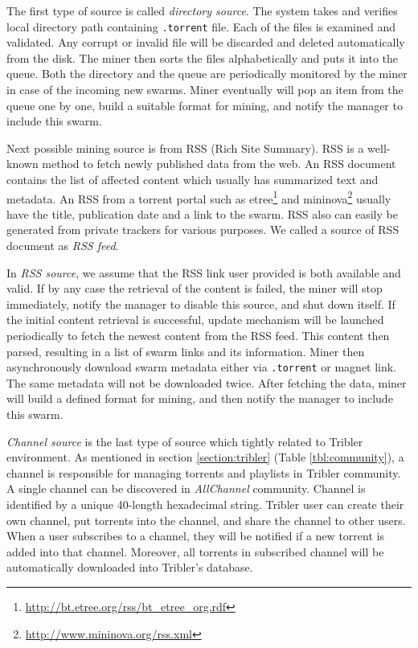 The first type of source is called \textit{directory source}. The system takes and verifies local directory path containing \texttt{.torrent} file. Each of the files is examined and validated. Any corrupt or invalid file will be discarded and deleted automatically from the disk. The miner then sorts the files alphabetically and puts it into the queue. Both the directory and the queue are periodically monitored by the miner in case of the incoming new swarms. Miner eventually will pop an item from the queue one by one, build a suitable format for mining, and notify the manager to include this swarm.

Next possible mining source is from RSS (Rich Site Summary). RSS is a well-known method to fetch newly published data from the web. An RSS document contains the list of affected content which usually has summarized text and metadata. An RSS from a torrent portal such as etree\footnote{\url{http://bt.etree.org/rss/bt_etree_org.rdf}} and mininova\footnote{\url{http://www.mininova.org/rss.xml}} usually have the title, publication date and a link to the swarm. RSS also can easily be generated from private trackers for various purposes. We called a source of RSS document as \textit{RSS feed}. 

In \textit{RSS source}, we assume that the RSS link user provided is both available and valid. If by any case the retrieval of the content is failed, the miner will stop immediately, notify the manager to disable this source, and shut down itself. If the initial content retrieval is successful, update mechanism will be launched periodically to fetch the newest content from the RSS feed. This content then parsed, resulting in a list of swarm links and its information. Miner then asynchronously download swarm metadata either via \texttt{.torrent} or magnet link. The same metadata will not be downloaded twice. After fetching the data, miner will build a defined format for mining, and then notify the manager to include this swarm. 

\textit{Channel source} is the last type of source which tightly related to Tribler environment. As mentioned in section \ref{section:tribler} (Table \ref{tbl:community}), a channel is responsible for managing torrents and playlists in Tribler community. A single channel can be discovered in \textit{AllChannel} community. Channel is identified by a unique 40-length hexadecimal string. Tribler user can create their own channel, put torrents into the channel, and share the channel to other users. When a user subscribes to a channel, they will be notified if a new torrent is added into that channel. Moreover, all torrents in subscribed channel will be automatically downloaded into Tribler's database.

